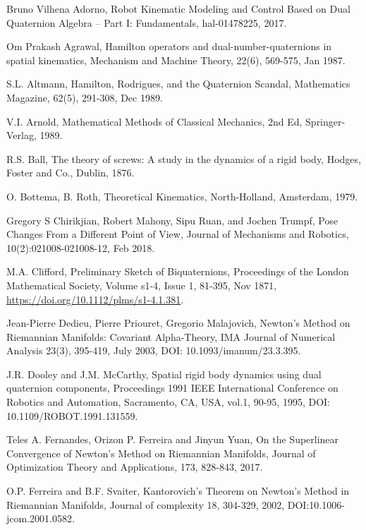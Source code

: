 \documentclass[reqno,12pt]{amsart}
\begin{document}
\begin{thebibliography}{99}

 Bruno Vilhena Adorno, Robot Kinematic Modeling and Control Based on Dual Quaternion Algebra -- Part I: Fundamentals, hal-01478225, 2017.

 Om Prakash Agrawal, Hamilton operators and dual-number-quaternions in spatial kinematics, Mechanism and Machine Theory, 22(6), 569-575, Jan 1987.

 S.L. Altmann, Hamilton, Rodrigues, and the Quaternion Scandal, Mathematics Magazine, 62(5), 291-308, Dec 1989.

 V.I. Arnold, Mathematical Methods of Classical Mechanics, 2nd Ed, Springer-Verlag, 1989.

 R.S. Ball, The theory of screws: A study in the dynamics of a rigid body, Hodges, Foster and Co., Dublin, 1876.

 O. Bottema, B. Roth, Theoretical Kinematics, North-Holland, Amsterdam, 1979.

 Gregory S Chirikjian, Robert Mahony, Sipu Ruan, and Jochen Trumpf, Pose Changes From a Different Point of View, Journal of Mechanisms and Robotics, 10(2):021008-021008-12, Feb 2018.

 M.A. Clifford, Preliminary Sketch of Biquaternions, Proceedings of the London Mathematical Society, Volume s1-4, Issue 1, 81-395, Nov 1871, \url{https://doi.org/10.1112/plms/s1-4.1.381}.

 Jean-Pierre Dedieu, Pierre Priouret, Gregorio Malajovich, Newton’s Method on Riemannian Manifolds: Covariant Alpha-Theory, IMA Journal of Numerical Analysis 23(3), 395-419, July 2003, DOI: 10.1093/imanum/23.3.395.

 J.R. Dooley and J.M. McCarthy, Spatial rigid body dynamics using dual quaternion components, Proceedings 1991 IEEE International Conference on Robotics and Automation, Sacramento, CA, USA, vol.1, 90-95, 1995, DOI: 10.1109/ROBOT.1991.131559.

 Teles A. Fernandes, Orizon P. Ferreira and Jinyun Yuan, On the Superlinear Convergence of Newton’s Method on Riemannian Manifolds, Journal of Optimization Theory and Applications, 173, 828-843, 2017.

 O.P. Ferreira and B.F. Svaiter, Kantorovich's Theorem on Newton's Method in Riemannian Manifolds, Journal of complexity 18, 304-329, 2002, DOI:10.1006-jcom.2001.0582.


\end{thebibliography}
\end{document}
